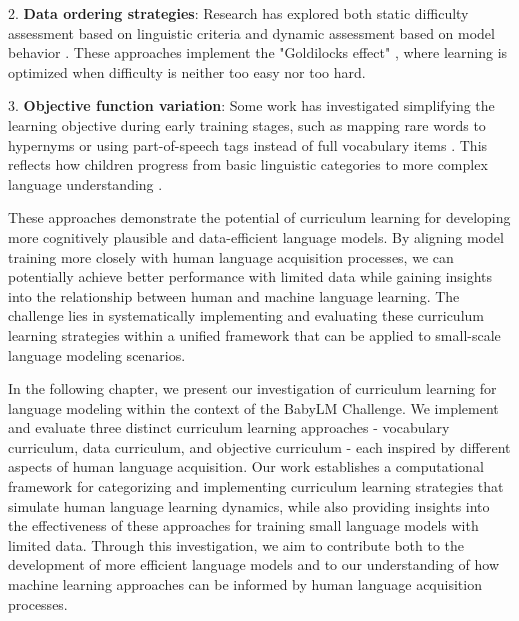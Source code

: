 2. \textbf{Data ordering strategies}: Research has explored both static difficulty assessment based on linguistic criteria \cite{campos2021curriculum, kocmi2017curriculum, liu2018curriculum, platanios2019competence} and dynamic assessment based on model behavior \cite{sachan2016easy, lalor2020dynamic}. These approaches implement the "Goldilocks effect" \cite{kidd2012goldilocks}, where learning is optimized when difficulty is neither too easy nor too hard.

3. \textbf{Objective function variation}: Some work has investigated simplifying the learning objective during early training stages, such as mapping rare words to hypernyms \cite{bai2022better} or using part-of-speech tags instead of full vocabulary items \cite{wang2023language, cui2022lert}. This reflects how children progress from basic linguistic categories to more complex language understanding \cite{alishahi2010computational, gleitman1990structural}.

These approaches demonstrate the potential of curriculum learning for developing more cognitively plausible and data-efficient language models. By aligning model training more closely with human language acquisition processes, we can potentially achieve better performance with limited data while gaining insights into the relationship between human and machine language learning. The challenge lies in systematically implementing and evaluating these curriculum learning strategies within a unified framework that can be applied to small-scale language modeling scenarios.

In the following chapter, we present our investigation of curriculum learning for language modeling within the context of the BabyLM Challenge. We implement and evaluate three distinct curriculum learning approaches - vocabulary curriculum, data curriculum, and objective curriculum - each inspired by different aspects of human language acquisition. Our work establishes a computational framework for categorizing and implementing curriculum learning strategies that simulate human language learning dynamics, while also providing insights into the effectiveness of these approaches for training small language models with limited data. Through this investigation, we aim to contribute both to the development of more efficient language models and to our understanding of how machine learning approaches can be informed by human language acquisition processes.
